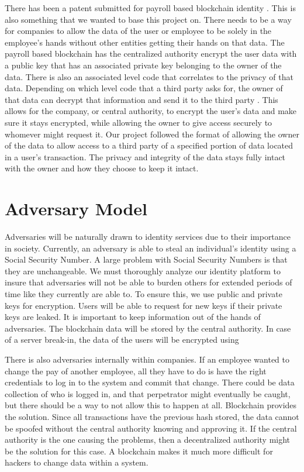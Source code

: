 \documentclass[letterpaper, 10 pt, conference]{ieeeconf}  %
\begin{document}
There has been a patent submitted for payroll based blockchain identity \cite{2}. This is also something that we wanted to base this project on. There needs to be a way for companies to allow the data of the user or employee to be solely in the employee's hands without other entities getting their hands on that data. The payroll based blockchain has the centralized authority encrypt the user data with a public key that has an associated private key belonging to the owner of the data. There is also an associated level code that correlates to the privacy of that data. Depending on which level code that a third party asks for, the owner of that data can decrypt that information and send it to the third party \cite{2}. This allows for the company, or central authority, to encrypt the user's data and make sure it stays encrypted, while allowing the owner to give access securely to whomever might request it. Our project followed the format of allowing the owner of the data to allow access to a third party of a specified portion of data located in a user's transaction. The privacy and integrity of the data stays fully intact with the owner and how they choose to keep it intact.

\section{Adversary Model}

Adversaries will be naturally drawn to identity services due to their importance in society.  Currently, an adversary is able to steal an individual's identity using a Social Security Number.  A large problem with Social Security Numbers is that they are unchangeable.  We must thoroughly analyze our identity platform to insure that adversaries will not be able to burden others for extended periods of time like they currently are able to.  To ensure this, we use public and private keys for encryption.  Users will be able to request for new keys if their private keys are leaked.  It is important to keep information out of the hands of adversaries.  The blockchain data will be stored by the central authority.  In case of a server break-in, the data of the users will be encrypted using

There is also adversaries internally within companies. If an employee wanted to change the pay of another employee, all they have to do is have the right credentials to log in to the system and commit that change. There could be data collection of who is logged in, and that perpetrator might eventually be caught, but there should be a way to not allow this to happen at all. Blockchain provides the solution. Since all transactions have the previous hash stored, the data cannot be spoofed without the central authority knowing and approving it. If the central authority is the one causing the problems, then a decentralized authority might be the solution for this case. A blockchain makes it much more difficult for hackers to change data within a system.   
\end{document}
